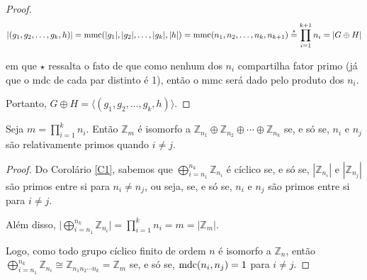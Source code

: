 \begin{proof}
		\begin{align*}
		|(g_1, g_2, \dots, g_k, h)| = \operatorname{mmc}(|g_1|, |g_2|, \dots, |g_k|, |h|) = \operatorname{mmc}(n_1, n_2, \dots, n_k, n_{k+1}) \overset{\star}{=} \prod_{i=1}^{k+1}n_i = |G\oplus H|
		\end{align*} 
		\par\vspace{0.3cm} em que $\star$ ressalta o fato de que como nenhum dos $n_i$ compartilha fator primo (já que o mdc de cada par distinto é 1), então o mmc será dado pelo produto dos $n_i$.
		\par\vspace{0.3cm} Portanto, $G\oplus H = \langle (g_1, g_2, \dots, g_k, h) \rangle$. 
		
	\end{proof}
	
	\begin{corollary}
		\label{C2}
		Seja $\displaystyle{m = \prod_{i=1}^{k}n_i}$. Então $\mathbb{Z}_m$ é isomorfo a $\mathbb{Z}_{n_1}\oplus\mathbb{Z}_{n_2}\oplus\cdots\oplus\mathbb{Z}_{n_k}$ se, e só se, $n_i$ e $n_j$ são relativamente primos quando $i\neq j$.
	\end{corollary}
	
	\begin{proof}
		Do Corolário \eqref{C1}, sabemos que $\displaystyle{\bigoplus_{i=n_1}^{n_k} \mathbb{Z}_{n_i}}$ é cíclico se, e só se, $|\mathbb{Z}_{n_i}|$ e $|\mathbb{Z}_{n_j}|$ são primos entre si para $n_i\neq n_j$, ou seja, se, e só se, $n_i$ e $n_j$ são primos entre si para $i\neq j$. 
		\par\vspace{0.3cm} Além disso, $\Bigg|\displaystyle{\bigoplus_{i=n_1}^{n_k} \mathbb{Z}_{n_i}\Bigg| = \prod_{i = 1}^{k}n_i = m = |\mathbb{Z}_m|}$. 
		\par\vspace{0.3cm} Logo, como todo grupo cíclico finito de ordem $n$ é isomorfo a $\mathbb{Z}_n$, então $\displaystyle{\bigoplus_{i=n_1}^{n_k} \mathbb{Z}_{n_i} \cong \mathbb{Z}_{n_1n_2\cdots n_k}} = \mathbb{Z}_m$ se, e só se, $\operatorname{mdc}(n_i, n_j) = 1$ para $i\neq j$. 
		
	\end{proof}
	
	
